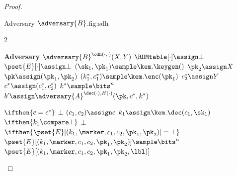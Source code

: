 \begin{proof}
\begin{itemize}
                                    \begin{gamefigure}{Adversary $\adversary{B}$.}{fig:sdh}
                                        \begin{games}{2}
                                            \begin{gameenv}{\textbf{Adversary} $\adversary{B}^{\odh(\cdot, \cdot)}(X, Y)$}
                                                \State $\ROMtable[\cdot] \assign \bot$
                                                \State $\pset{E}[\cdot] \assign \bot$
                                                \State $(\sk_1, \pk_1) \sample \kem.\keygen()$
                                                \State $\pk_2 \assign X$
                                                \State $\pk \assign (\pk_1, \pk_2)$
                                                \State $(k^*_1, c^*_1) \sample \kem.\enc(\pk_1)$
                                                \State $c^*_2 \assign Y$
                                                \State $c^* \assign (c^*_1, c^*_2)$
                                                \State $k^* \sample \bits^{n}$
                                                \State $b' \assign \adversary{A}^{\dec(\cdot), H(\cdot)}(\pk, c^*, k^*)$
                                            \end{gameenv}
                                            \gamebreak
                                            \begin{gameenv}{\oracledec}
                                                \State $\ifthen{c = c^*}$
                                                    \State \quad \Return $\bot$
                                                    \State $(c_1, c_2) \assign c$
                                                    \State $k_1 \assign \kem.\dec(c_1, \sk_1)$
                                                    \State $\ifthen{k_1 \compare \bot}$
                                                        \State \quad \Return $\bot$
                                                        \State $\ifthen{\pset{E}[(k_1, \marker, c_1, c_2, \pk_1, \pk_2)] = \bot}$
                                                            \State \quad $\pset{E}[(k_1, \marker, c_1, c_2, \pk_1, \pk_2)] \sample \bits^{n}$
                                                            \State \Return $\pset{E}[(k_1, \marker, c_1, c_2, \pk_1, \pk_2,\lbl)]$
                                                            \Statex
                                                            \State \underline{}

\end{gameenv}
\end{games}
\end{gamefigure}
\end{itemize}
\end{proof}
